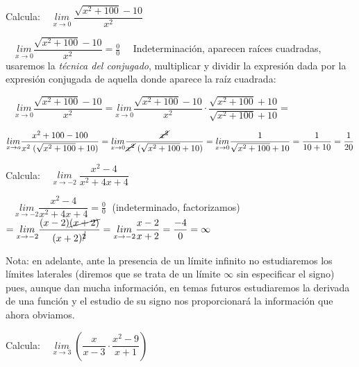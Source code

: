 	\begin{ejre} Calcula: $\quad \underset {x\to 0}{lim}\; {\dfrac {\sqrt{x^2+100}-10}{x^2}}$
		
	\end{ejre}
	
	\begin{proofw}\renewcommand{\qedsymbol}{$\diamond$}

	$\quad \underset {x\to 0}{lim}{\dfrac {\sqrt{x^2+100}-10}{x^2}}=\frac 0 0\quad$ Indeterminación, aparecen raíces cuadradas, usaremos la \emph{técnica del conjugado}, multiplicar y dividir la expresión dada por la expresión conjugada de aquella donde aparece la raíz cuadrada:
	
	$\quad \underset {x\to 0}{lim}{\dfrac {\sqrt{x^2+100}-10}{x^2}}= \underset {x\to 0}{lim}{\dfrac {\sqrt{x^2+100}-10}{x^2}}\cdot \dfrac{\sqrt{x^2+100}+10}{\sqrt{x^2+100}+10} =$
	
	$ \underset {x\to o}{lim}{\dfrac {x^2+100-100}{x^2\; (\sqrt{x^2+100}+10)}}=\underset {x\to 0}{lim}{\dfrac {\cancel{x^2}}{\cancel{x^2}\; (\sqrt{x^2+100}+10)}}=\underset {x\to 0}{lim}{\dfrac 1 {\sqrt{x^2+100}+10}}=\dfrac 1 {10+10}=\dfrac 1 {20}$ 
	
	\end{proofw}
	
	\begin{ejre} Calcula: $\quad \underset {x \to -2}{lim}\; {\dfrac {x^2-4}{x^2+4x+4}} $
		
	\end{ejre}
	\begin{proofw}\renewcommand{\qedsymbol}{$\diamond$}
	
	$\quad \underset {x \to -2}{lim}{\dfrac {x^2-4}{x^2+4x+4}} = \frac 0 0\; $ (indeterminado, factorizamos) 	
	$= \underset {x \to -2}{lim}{\dfrac {(x-2) \cancel{(x+2)}}{(x+2)^ {\cancel{2}}}} = \underset {x \to -2}{lim} {\dfrac {x-2}{x+2}} = \dfrac {-4}{0}=\infty $  

	\end{proofw}
	
	Nota: en adelante, ante la presencia de un límite infinito no estudiaremos los límites laterales (diremos que se trata de un límite $\infty$ sin especificar el signo) pues, aunque dan mucha información, en temas futuros estudiaremos la derivada de una función y el estudio de su signo nos proporcionará la información que ahora obviamos. 
	
	\begin{ejre} Calcula: $\quad \underset {x \to 3}{lim}\; \left({\dfrac {x}{x-3} \cdot \dfrac {x^2-9}{x+1}}\right)$	
	\end{ejre}
	
